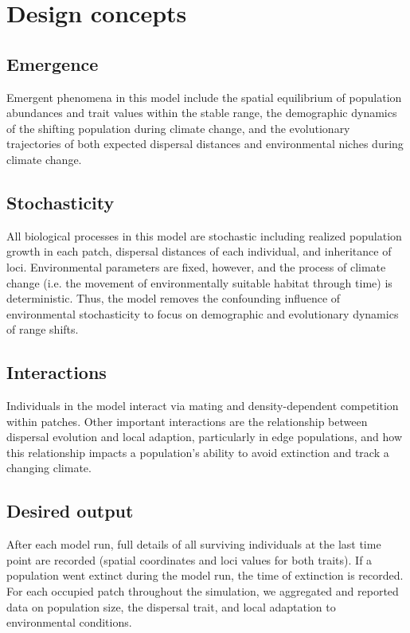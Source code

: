 \documentclass[12pt, oneside]{article}
\begin{document}
\section*{Design concepts}
\subsection*{Emergence} 
Emergent phenomena in this model include the spatial equilibrium of population abundances and trait values within the stable range, the demographic dynamics of the shifting population during climate change, and the evolutionary trajectories of both expected dispersal distances and environmental niches during climate change.

\subsection*{Stochasticity} 
All biological processes in this model are stochastic including realized population growth in each patch, dispersal distances of each individual, and inheritance of loci. Environmental parameters are fixed, however, and the process of climate change (i.e. the movement of environmentally suitable habitat through time) is deterministic. Thus, the model removes the confounding influence of environmental stochasticity to focus on demographic and evolutionary dynamics of range shifts.

\subsection*{Interactions} 
Individuals in the model interact via mating and density-dependent competition within patches. Other important interactions are the relationship between dispersal evolution and local adaption, particularly in edge populations, and how this relationship impacts a population's ability to avoid extinction and track a changing climate.

\subsection*{Desired output} 
After each model run, full details of all surviving individuals at the last time point are recorded (spatial coordinates and loci values for both traits). If a population went extinct during the model run, the time of extinction is recorded. For each occupied patch throughout the simulation, we aggregated and reported data on population size, the dispersal trait, and local adaptation to environmental conditions. 
\end{document}
